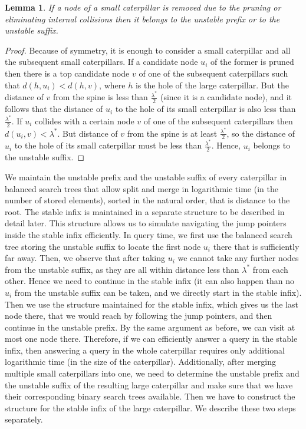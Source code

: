 \documentclass[11pt,a4paper]{article}
\newtheorem{lemma}{Lemma}
\theoremstyle{definition}
\theoremstyle{remark}
\begin{document}
\begin{lemma}
\label{stable infix}
If a node of a small caterpillar is removed due to the pruning or eliminating internal collisions then it
belongs to the unstable prefix or to the unstable suffix.
\end{lemma}

\begin{proof}
Because of symmetry, it is enough to consider a small caterpillar and all the subsequent
small caterpillars. If a candidate node $u_{i}$ of the former is pruned then there is a top candidate node
$v$ of one of the subsequent caterpillars such that $d(h,u_{i}) < d(h,v)$, where $h$ is the hole
of the large caterpillar. But the distance of $v$ from the spine is less than $\frac{\lambda^{*}}{2}$ (since it is a candidate node),
 and it follows that the distance of $u_{i}$ to the hole of its small caterpillar is also less
than $\frac{\lambda^{*}}{2}$. If $u_{i}$ collides with a certain node $v$ of one of the subsequent
caterpillars then $d(u_{i},v)<\lambda^{*}$. But distance of $v$ from the spine is at least
$\frac{\lambda^{*}}{2}$, so the distance of $u_{i}$ to the hole of its small caterpillar must be
less than $\frac{\lambda^{*}}{2}$. Hence, $u_{i}$ belongs to the unstable suffix.
\end{proof}

We maintain the unstable prefix and the unstable suffix of every caterpillar in balanced search
trees that allow split and merge in logarithmic time (in the number of stored elements), sorted
in the natural order, that is distance to the root.
The stable infix is maintained in a separate structure to be described in detail later. This
structure allows us to simulate navigating the jump pointers inside the stable infix efficiently.
In query time, we first use the balanced search tree storing the unstable suffix to locate the first node
$u_{i}$ there that is sufficiently far away. Then, we observe that after taking $u_{i}$ we cannot
take any further nodes from the unstable suffix, as they are all within distance less than
$\lambda^{*}$ from each other. Hence we need to continue in the stable infix (it can also
happen than no $u_{i}$ from the unstable suffix can be taken, and we directly start in the stable
infix). Then we use the structure maintained for the stable infix, which gives us the last
node there, that we would reach by following the jump pointers, and then continue in the
unstable prefix. By the same argument as before, we can visit at most one node there.
Therefore, if we can efficiently answer a query in the stable infix, then answering a query in
the whole caterpillar requires only additional logarithmic time (in the size of the caterpillar).
Additionally, after merging multiple small caterpillars into one, we need to determine the unstable
prefix and the unstable suffix of the resulting large caterpillar and make sure that we have
their corresponding binary search trees available.
Then we have to construct the structure for the stable infix of the large caterpillar.
We describe these two steps separately.
\end{document}
